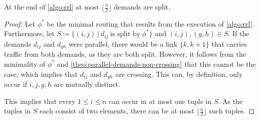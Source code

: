 \begin{lemma}
	\label{lemma:number-of-split-demands}
	At the end of \cref{algo:rrl} at most $\lfloor\frac{n}{2}\rfloor$ demands are split.
\end{lemma}
\begin{proof}
	Let $\phi^\ast$ be the minimal routing that results from the execution of \cref{algo:rrl}.
	Furthermore, let $S \coloneqq \{(i, j)\ |\ d_{ij}\ \text{is split by}\ \phi^\ast \}$ and $(i, j), (g, h) \in S$.
	If the demands $d_{ij}$ and $d_{gh}$ were parallel, there would be a link $\{k, k+1\}$ that carries traffic from both demands, as they are both split.
	However, it follows from the minimality of $\phi^\ast$ and \cref{theo:parallel-demands-non-crossing} that this cannot be the case, which implies that $d_{ij}$ and $d_{gh}$ are crossing.
	This can, by definition, only occur if $i, j, g, h$ are mutually distinct.
	
	This implies that every $1 \leq i \leq n$ can occur in at most one tuple in $S$.
	As the tuples in $S$ each consist of two elements, there can be at most $\lfloor\frac{n}{2}\rfloor$ such tuples.
\end{proof}